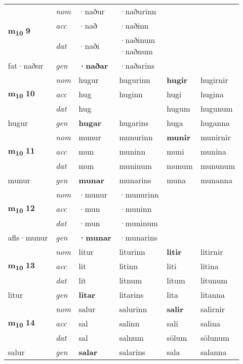 \begin{longtable}[l]{X>{\footnotesize\itshape}XXXXX}
\multirow{3}{*}{{{\textbf{m{\textsubscript{10}}} \Large{\textbf{9}}}}} & nom & ·naður & ·naðurinn & \textbf{} &  \\*
 & acc & ·nað & ·naðinn &  &  \\*
 & dat & ·naði & \specialcell{·naðinum\\  ·naðnum} &  &  \\*
 {\footnotesize{fat\allowbreak ·naður}} & gen & \textbf{·naðar} & ·naðarins &  &  \\
\cmidrule{1-6}

\multirow{3}{*}{{{\textbf{m{\textsubscript{10}}} \Large{\textbf{10}}}}} & nom & hugur & hugurinn & \textbf{hugir} & hugirnir \\*
 & acc & hug & huginn & hugi & hugina \\*
 & dat & hug &  & hugum & hugunum \\*
 {\footnotesize{hugur}} & gen & \textbf{hugar} & hugarins & huga & huganna \\
\cmidrule{1-6}

\multirow{3}{*}{{{\textbf{m{\textsubscript{10}}} \Large{\textbf{11}}}}} & nom & munur & munurinn & \textbf{munir} & munirnir \\*
 & acc & mun & muninn & muni & munina \\*
 & dat & mun & muninum & munum & mununum \\*
 {\footnotesize{munur}} & gen & \textbf{munar} & munarins & muna & munanna \\
\cmidrule{1-6}

\multirow{3}{*}{{{\textbf{m{\textsubscript{10}}} \Large{\textbf{12}}}}} & nom & ·munur & ·munurinn & \textbf{} &  \\*
 & acc & ·mun & ·muninn &  &  \\*
 & dat & ·mun & ·muninum &  &  \\*
 {\footnotesize{afls\allowbreak ·munur}} & gen & \textbf{·munar} & ·munarins &  &  \\
\cmidrule{1-6}

\multirow{3}{*}{{{\textbf{m{\textsubscript{10}}} \Large{\textbf{13}}}}} & nom & litur & liturinn & \textbf{litir} & litirnir \\*
 & acc & lit & litinn & liti & litina \\*
 & dat & lit & litnum & litum & litunum \\*
 {\footnotesize{litur}} & gen & \textbf{litar} & litarins & lita & litanna \\
\cmidrule{1-6}

\multirow{3}{*}{{{\textbf{m{\textsubscript{10}}} \Large{\textbf{14}}}}} & nom & salur & salurinn & \textbf{salir} & salirnir \\*
 & acc & sal & salinn & sali & salina \\*
 & dat & sal & salnum & sölum & sölunum \\*
 {\footnotesize{salur}} & gen & \textbf{salar} & salarins & sala & salanna \\
\cmidrule{1-6}


\end{longtable}
